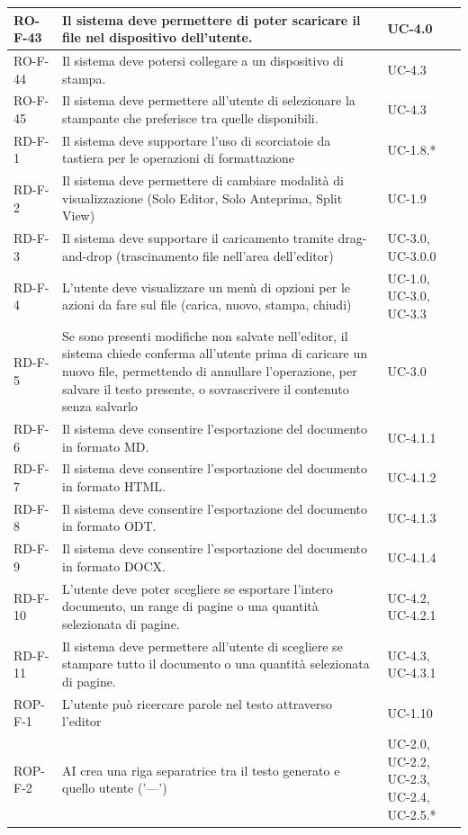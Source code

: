 \documentclass[11pt,a4paper]{article}
\begin{document}
\begin{longtable}{|p{}|>{\raggedright\arraybackslash}p{}|p{}|}
\hline
RO-F-43 & Il sistema deve permettere di poter scaricare il file nel dispositivo dell'utente. & UC-4.0\\
\hline
RO-F-44 & Il sistema deve potersi collegare a un dispositivo di stampa. & UC-4.3\\
\hline
RO-F-45 & Il sistema deve permettere all'utente di selezionare la stampante che preferisce tra quelle disponibili. & UC-4.3\\
\hline
RD-F-1 & Il sistema deve supportare l'uso di scorciatoie da tastiera per le operazioni di formattazione & UC-1.8.* \\
\hline
RD-F-2 & Il sistema deve permettere di cambiare modalità di visualizzazione (Solo Editor, Solo Anteprima, Split View) & UC-1.9 \\
\hline
RD-F-3 & Il sistema deve supportare il caricamento tramite drag-and-drop (trascinamento file nell'area dell'editor) & UC-3.0, UC-3.0.0 \\
\hline
RD-F-4 & L'utente deve visualizzare un menù di opzioni per le azioni da fare sul file (carica, nuovo, stampa, chiudi) & UC-1.0, UC-3.0, UC-3.3 \\
\hline
RD-F-5 & Se sono presenti modifiche non salvate nell'editor, il sistema chiede conferma all'utente prima di caricare un nuovo file, permettendo di annullare l'operazione, per salvare il testo presente, o sovrascrivere il contenuto senza salvarlo & UC-3.0 \\
\hline
RD-F-6 & Il sistema deve consentire l'esportazione del documento in formato MD. & UC-4.1.1 \\
\hline
RD-F-7 & Il sistema deve consentire l'esportazione del documento in formato HTML. & UC-4.1.2 \\
\hline
RD-F-8 & Il sistema deve consentire l'esportazione del documento in formato ODT. & UC-4.1.3 \\
\hline
RD-F-9 & Il sistema deve consentire l'esportazione del documento in formato DOCX. & UC-4.1.4 \\
\hline
RD-F-10 & L'utente deve poter scegliere se esportare l'intero documento, un range di pagine o una quantità selezionata di pagine. & UC-4.2, UC-4.2.1\\
\hline
RD-F-11 & Il sistema deve permettere all’utente di scegliere se stampare tutto il documento o una quantità selezionata di pagine. & UC-4.3, UC-4.3.1\\
\hline
ROP-F-1 & L'utente può ricercare parole nel testo attraverso l'editor & UC-1.10 \\
\hline
ROP-F-2 & AI crea una riga separatrice tra il testo generato e quello utente ('---') & UC-2.0, UC-2.2, UC-2.3, UC-2.4, UC-2.5.* \\

\end{longtable}
\end{document}
